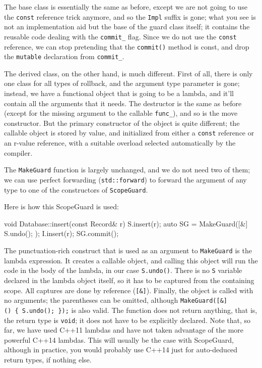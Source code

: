 The base class is essentially the same as before, except we are not going to use the \texttt{const} reference trick anymore, and so the \texttt{Impl} suffix is gone; what you see is not an implementation aid but the base of the guard class itself; it contains the reusable code dealing with the \texttt{commit\_} flag. Since we do not use the \texttt{const} reference, we can stop pretending that the \texttt{commit()} method is const, and drop the \texttt{mutable} declaration from \texttt{commit\_}.

The derived class, on the other hand, is much different. First of all, there is only one class for all types of rollback, and the argument type parameter is gone; instead, we have a functional object that is going to be a lambda, and it'll contain all the arguments that it needs. The destructor is the same as before (except for the missing argument to the callable \texttt{func\_}), and so is the move constructor. But the primary constructor of the object is quite different; the callable object is stored by value, and initialized from either a \texttt{const} reference or an r-value reference, with a suitable overload selected automatically by the compiler.

The \texttt{MakeGuard} function is largely unchanged, and we do not need two of them; we can use perfect forwarding (\texttt{std::forward}) to forward the argument of any type to one of the constructors of \texttt{ScopeGuard}.

Here is how this ScopeGuard is used:

\begin{code}
void Database::insert(const Record& r) {
  S.insert(r);
  auto SG = MakeGuard([&] { S.undo(); });
  I.insert(r);
  SG.commit();
}
\end{code}

The punctuation-rich construct that is used as an argument to \texttt{MakeGuard} is the lambda expression. It creates a callable object, and calling this object will run the code in the body of the lambda, in our case \texttt{S.undo()}. There is no \texttt{S} variable declared in the lambda object itself, so it has to be captured from the containing scope. All captures are done by reference (\texttt{{[}\&{]}}). Finally, the object is called with no arguments; the parentheses can be omitted, although \texttt{MakeGuard({[}\&{]}()\ \{\ S.undo();\ \});} is also valid. The function does not return anything, that is, the return type is \texttt{void}; it does not have to be explicitly declared. Note that, so far, we have used C++11 lambdas and have not taken advantage of the more powerful C++14 lambdas. This will usually be the case with ScopeGuard, although in practice, you would probably use C++14 just for auto-deduced return types, if nothing else.

